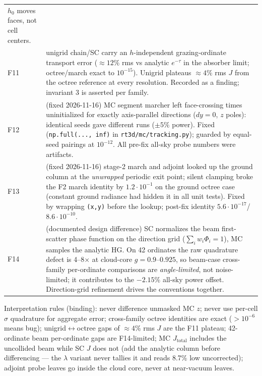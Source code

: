 \documentclass[11pt,a4paper]{article}
\begin{document}
\begin{table}[htbp]
\begin{tabular}{@{}p{0.9cm}p{14.8cm}@{}}
$h_0$ moves faces, not cell centers. \\
F11 & unigrid chain/SC carry an $h$-independent grazing-ordinate transport
error ($\approx12\%$ rms vs analytic $e^{-\tau}$ in the absorber limit;
octree/march exact to $10^{-15}$). Unigrid plateaus $\approx4\%$ rms $J$
from the octree reference at every resolution. Recorded as a finding;
invariant 3 is asserted per family. \\
F12 & (fixed 2026-11-16) MC segment marcher left face-crossing times
uninitialized for exactly axis-parallel directions ($dy=0$, $z$ poles):
identical seeds gave different runs ($\pm5\%$ power). Fixed
(\texttt{np.full(..., inf)} in \texttt{rt3d/mc/tracking.py}); guarded by
equal-seed pairings at $10^{-12}$. All pre-fix all-sky probe numbers were
artifacts. \\
F13 & (fixed 2026-11-16) stage-2 march and adjoint looked up the ground
column at the \emph{unwrapped} periodic exit point; silent clamping broke
the F2 march identity by $1.2\cdot10^{-1}$ on the ground octree case
(constant ground radiance had hidden it in all unit tests). Fixed by
wrapping \texttt{(x,y)} before the lookup; post-fix identity
$5.6\cdot10^{-17}$/$8.6\cdot10^{-10}$. \\
F14 & (documented design difference) SC normalizes the beam first-scatter
phase function on the direction grid ($\sum_i w_i\Phi_i=1$), MC samples
the analytic HG. On 42 ordinates the raw quadrature defect is 4--8$\times$
at cloud-core $g=0.9$--$0.925$, so beam-case cross-family per-ordinate
comparisons are \emph{angle-limited}, not noise-limited; it contributes to
the $-2.15\%$ all-sky power offset. Direction-grid refinement drives the
conventions together. \\
\bottomrule
\end{tabular}
\end{table}

Interpretation rules (binding): never difference unmasked MC $z$; never
use per-cell $\sigma$ quadrature for aggregate error; cross-family octree
identities are exact ($>10^{-6}$ means bug); unigrid$\leftrightarrow$octree
gaps of $\approx4\%$ rms $J$ are the F11 plateau; 42-ordinate beam
per-ordinate gaps are F14-limited; MC $J_{\mathrm{total}}$ includes the
uncollided beam while SC $J$ does not (add the analytic column before
differencing --- the $\lambda$ variant never tallies it and reads 8.7\%
low uncorrected); adjoint probe leaves go inside the cloud core, never at
near-vacuum leaves.

\end{document}
